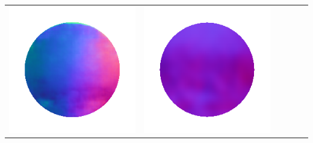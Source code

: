 \begin{center}
\begin{tabularx}{\linewidth}{@{}Y@{}Y@{}Y@{}Y@{}Y@{}Y@{}}
\includegraphics[width=\linewidth]{semisynthetic/20150514_13_marrnet_out.png} &
\includegraphics[width=\linewidth]{semisynthetic/20150514_13_ef_out.png} \\

\end{tabularx}
\end{center}
